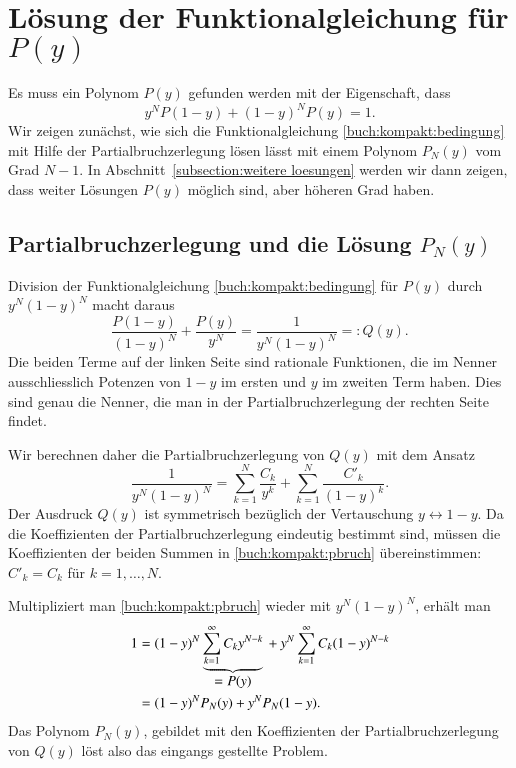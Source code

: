 %
%
%

\section{Lösung der Funktionalgleichung für $P(y)$
\label{section:partialbruch}}
Es muss ein Polynom $P(y)$ gefunden werden mit der Eigenschaft, dass
\begin{equation}
y^N P(1-y) + (1-y)^N P(y) = 1.
\label{buch:kompakt:bedingung}
\end{equation}
Wir zeigen zunächst, wie sich die Funktionalgleichung
\eqref{buch:kompakt:bedingung} mit Hilfe der Partialbruchzerlegung lösen
lässt mit einem Polynom $P_N(y)$ vom Grad $N-1$.
In Abschnitt~\ref{subsection:weitere loesungen} werden wir dann
zeigen, dass weiter Lösungen $P(y)$ möglich sind, aber höheren Grad haben.

\subsection{Partialbruchzerlegung und die Lösung $P_N(y)$}
%
Division der Funktionalgleichung \eqref{buch:kompakt:bedingung} für $P(y)$
durch $y^N(1-y)^N$ macht daraus
\[
\frac{P(1-y)}{(1-y)^N}
+
\frac{P(y)}{y^N}
=
\frac{1}{y^N(1-y)^N}
=:
Q(y).
\]
Die beiden Terme auf der linken Seite sind rationale Funktionen, die im
Nenner ausschliesslich Potenzen von $1-y$ im ersten und $y$ im zweiten
Term haben.
Dies sind genau die Nenner, die man in der Partialbruchzerlegung der rechten
Seite findet.

Wir berechnen daher die Partialbruchzerlegung von $Q(y)$ mit dem Ansatz
\begin{equation}
\frac{1}{y^N(1-y)^N}
=
\sum_{k=1}^N\frac{C_k}{y^k}
+
\sum_{k=1}^N\frac{C'_k}{(1-y)^k}.
\label{buch:kompakt:pbruch}
\end{equation}
Der Ausdruck $Q(y)$ ist symmetrisch bezüglich der Vertauschung
$y\leftrightarrow 1-y$.
Da die Koeffizienten der Partialbruchzerlegung eindeutig bestimmt sind,
müssen die Koeffizienten der beiden Summen in \eqref{buch:kompakt:pbruch}
übereinstimmen: $C'_k=C_k$ für $k=1,\dots,N$.

Multipliziert man \eqref{buch:kompakt:pbruch} wieder mit $y^N(1-y)^N$,
erhält man
\begin{align*}
1
&=
(1-y)^N
\underbrace{\sum_{k=1}^\infty C_k y^{N-k}}_{\displaystyle =P(y)}
\mathstrut
+
y^N
\sum_{k=1}^\infty C_k (1-y)^{N-k}
\\
&=
(1-y)^N
P_N(y)
+
y^N
P_N(1-y).
\end{align*}
Das Polynom $P_N(y)$, gebildet mit den Koeffizienten der Partialbruchzerlegung
von $Q(y)$ löst also das eingangs gestellte Problem.

